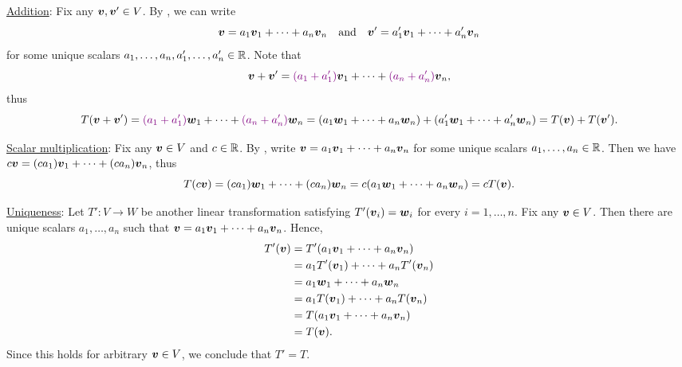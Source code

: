 \begin{enumerate}
\begin{pf}
\begin{pf}
\underline{Addition}: Fix any \(\vb*{v},\vb*{v}'\in V\). By
, we can write
\[
\vect{v}=a_1\vect{v}_1+\dotsb+a_n\vect{v}_n
\qqtext{and}
\vect{v}'=a_1'\vect{v}_1+\dotsb+a_n'\vect{v}_n
\]
for some unique scalars \(a_1,\dotsc,a_n,a_1',\dotsc,a_n'\in\mathbb{R}\). Note that
\[
\vb*{v}+\vb*{v}'={\color{violet}(a_1+a_1')}\vb*{v}_1+\dotsb+{\color{violet}(a_n+a_n')}\vb*{v}_n,
\]
thus
\[
T(\vb*{v}+\vb*{v}')={\color{violet}(a_1+a_1')}\vb*{w}_1+\dotsb+{\color{violet}(a_n+a_n')}\vb*{w}_n
=(a_1\vb*{w}_1+\dotsb+a_n\vb*{w}_n)+(a_1'\vb*{w}_1+\dotsb+a_n'\vb*{w}_n)
=T(\vb*{v})+T(\vb*{v}').
\]

\underline{Scalar multiplication}: Fix any \(\vb*{v}\in V\) and \(c\in\mathbb{R}\). By 
, write
\(\vb*{v}=a_1\vb*{v}_1+\dotsb+a_n\vb*{v}_n\) for some unique scalars
\(a_1,\dotsc,a_n\in\mathbb{R}\). Then we have
\(c\vb*{v}=(ca_1)\vb*{v}_1+\dotsb+(ca_n)\vb*{v}_n\), thus
\[
T(c\vb*{v})=(ca_1)\vb*{w}_1+\dotsb+(ca_n)\vb*{w}_n
=c(a_1\vb*{w}_1+\dotsb+a_n\vb*{w}_n)
=cT(\vb*{v}).
\]
\end{pf}

\underline{Uniqueness}: Let \(T':V\to W\) be another linear transformation
satisfying \(T'(\vb*{v}_i)=\vb*{w}_i\) for every \(i=1,\dotsc,n\). Fix any
\(\vb*{v}\in V\). Then there are unique scalars \(a_1,\dotsc,a_n\) such that
\(\vb*{v}=a_1\vb*{v}_1+\dotsb+a_n\vb*{v}_n\). Hence,
\begin{align*}
T'(\vb*{v})
&=T'(a_1\vb*{v}_1+\dotsb+a_n\vb*{v}_n) \\
&=a_1T'(\vb*{v}_1)+\dotsb+a_nT'(\vb*{v}_n) \\
&=a_1\vb*{w}_1+\dotsb+a_n\vb*{w}_n \\
&=a_1T(\vb*{v}_1)+\dotsb+a_nT(\vb*{v}_n) \\
&=T(a_1\vb*{v}_1+\dotsb+a_n\vb*{v}_n) \\
&=T(\vb*{v}).
\end{align*}
Since this holds for arbitrary \(\vb*{v}\in V\), we conclude that \(T'=T\).
\end{pf}
\end{enumerate}
